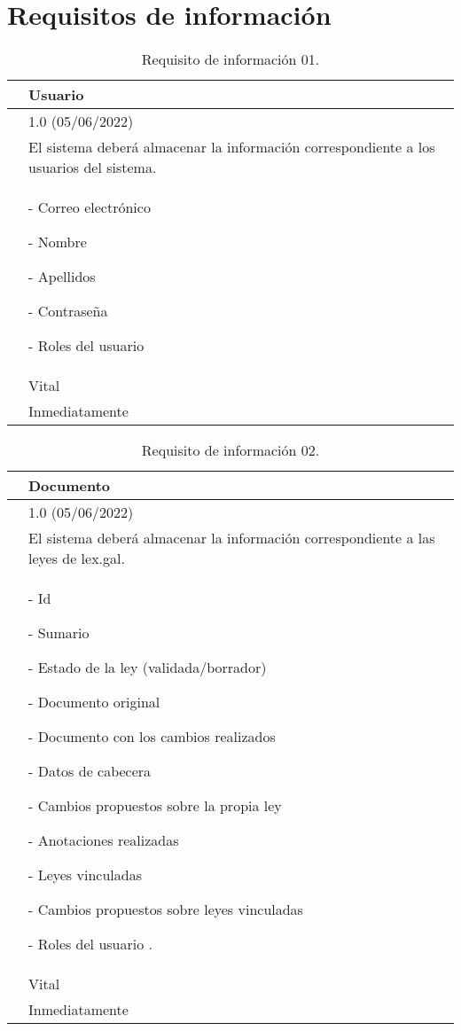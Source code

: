 \section{Requisitos de información}
\label{APRequisitosInformacion}

\begin{table}[H]
\begin{center}
\begin{tabular}{|p{3cm}|p{10cm}|} \hline
\centering {\bf IRQ-01} & Usuario  \\ \hline\hline
\centering {\bf Versión} & 1.0 (05/06/2022) \\ \hline
\centering {\bf Descripción} & El sistema deberá almacenar la información correspondiente a los usuarios del sistema. \\ \hline
\centering {\bf Datos específicos} & 
- Correo electrónico

- Nombre

- Apellidos

- Contraseña

- Roles del usuario
\\ \hline
\centering {\bf Importancia} & Vital \\ \hline
\centering {\bf Urgencia} & Inmediatamente \\ \hline
\end{tabular}
\caption{Requisito de información 01.}
\label{enlaceIRQ1}
\end{center}
\end{table}

\begin{table}[H]
\begin{center}
\begin{tabular}{|p{3cm}|p{10cm}|} \hline
\centering {\bf IRQ-02} & Documento  \\ \hline\hline
\centering {\bf Versión} & 1.0 (05/06/2022) \\ \hline
\centering {\bf Descripción} & El sistema deberá almacenar la información correspondiente a las leyes de lex.gal. \\ \hline
\centering {\bf Datos específicos}  & 
- Id

- Sumario

- Estado de la ley (validada/borrador)

- Documento original

- Documento con los cambios realizados

- Datos de cabecera

- Cambios propuestos sobre la propia ley

- Anotaciones realizadas

- Leyes vinculadas

- Cambios propuestos sobre leyes vinculadas

- Roles del usuario
. \\ \hline
\centering {\bf Importancia} & Vital \\ \hline
\centering {\bf Urgencia} & Inmediatamente \\ \hline
\end{tabular}
\caption{Requisito de información 02.}
\label{enlaceIRQ2}
\end{center}
\end{table}
